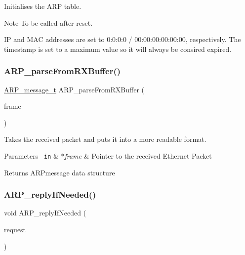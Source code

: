 Initialises the A\+RP table. 

\begin{DoxyNote}{Note}
To be called after reset.
\end{DoxyNote}
IP and M\+AC addresses are set to 0\+:0\+:0\+:0 / 00\+:00\+:00\+:00\+:00\+:00, respectively. The timestamp is set to a maximum value so it will always be consired expired. \mbox{\label{group__arp_gaa4326b29383563a2d0bae66883d2aeb6}} 
\subsubsection{\texorpdfstring{ARP\_parseFromRXBuffer()}{ARP\_parseFromRXBuffer()}}
{\footnotesize\ttfamily \mbox{\hyperlink{group__arp_ga1708785291f10e8cc257efe2b769ba4c}{A\+R\+P\+\_\+message\+\_\+t}} A\+R\+P\+\_\+parse\+From\+R\+X\+Buffer (\begin{DoxyParamCaption}\item[{\mbox{\hyperlink{group__ethernet_ga7519a7ae14b490659069435698d28a25}{ethernet\+Frame\+\_\+t}} $\ast$}]{frame }\end{DoxyParamCaption})}



Takes the received packet and puts it into a more readable format. 


\begin{DoxyParams}[1]{Parameters}
\mbox{\texttt{ in}}  & {\em $\ast$frame} & Pointer to the received Ethernet Packet \\
\hline
\end{DoxyParams}
\begin{DoxyReturn}{Returns}
A\+R\+Pmessage data structure 
\end{DoxyReturn}
\mbox{\label{group__arp_gae3e5d52fa89b91d6552cb328b8b6ec81}} 
\subsubsection{\texorpdfstring{ARP\_replyIfNeeded()}{ARP\_replyIfNeeded()}}
{\footnotesize\ttfamily void A\+R\+P\+\_\+reply\+If\+Needed (\begin{DoxyParamCaption}\item[{\mbox{\hyperlink{group__arp_ga1708785291f10e8cc257efe2b769ba4c}{A\+R\+P\+\_\+message\+\_\+t}}}]{request }\end{DoxyParamCaption})}



